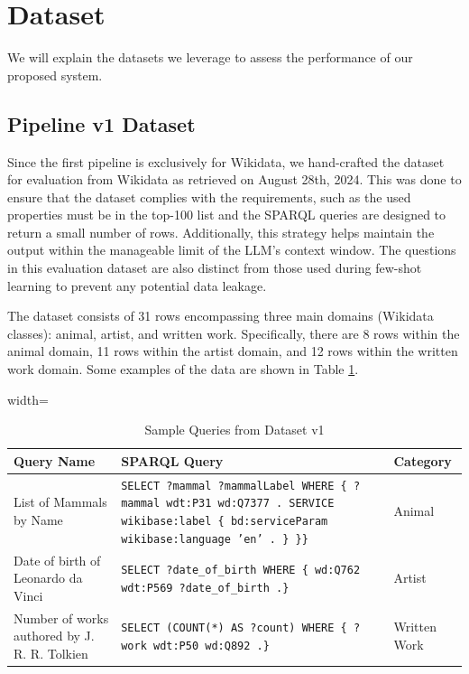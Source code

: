 \section{Dataset}
We will explain the datasets we leverage to assess the performance of our proposed system.

\subsection{Pipeline v1 Dataset}
\label{dataset-isriti}
Since the first pipeline is exclusively for Wikidata, we hand-crafted the dataset for evaluation from Wikidata as retrieved on August 28th, 2024. This was done to ensure that the dataset complies with the requirements, such as the used properties must be in the top-100 list and the SPARQL queries are designed to return a small number of rows. Additionally, this strategy helps maintain the output within the manageable limit of the LLM's context window. The questions in this evaluation dataset are also distinct from those used during few-shot learning to prevent any potential data leakage.

The dataset consists of 31 rows encompassing three main domains (Wikidata classes): animal, artist, and written work. Specifically, there are 8 rows within the animal domain, 11 rows within the artist domain, and 12 rows within the written work domain. Some examples of the data are shown in Table \ref{table-queries-v1}.

\begin{table}
\centering
\renewcommand{\arraystretch}{1.15}
\setlength{\tabcolsep}{12pt}
\begin{adjustbox}{width=\textwidth}
    \begin{tabular}{| m{} | m{} |  m{} |}
    \hline
    \textbf{Query Name} & \textbf{SPARQL Query} & \textbf{Category}\\
    \hline
    List of Mammals by Name & \texttt{SELECT ?mammal ?mammalLabel WHERE \{ ?mammal wdt:P31 wd:Q7377 . SERVICE wikibase:label \{ bd:serviceParam wikibase:language 'en' . \} \}\}} & Animal \\
    \hline
    Date of birth of Leonardo da Vinci & \texttt{SELECT ?date\_of\_birth WHERE \{ wd:Q762 wdt:P569 ?date\_of\_birth .\}} & Artist \\
    \hline
    Number of works authored by J. R. R. Tolkien & \texttt{SELECT (COUNT(*) AS ?count) WHERE \{ ?work wdt:P50 wd:Q892 .\}} & Written Work \\
    \hline
    \end{tabular}
\end{adjustbox}
\vspace{1em}
\caption{Sample Queries from Dataset v1}
\label{table-queries-v1}
\end{table}


